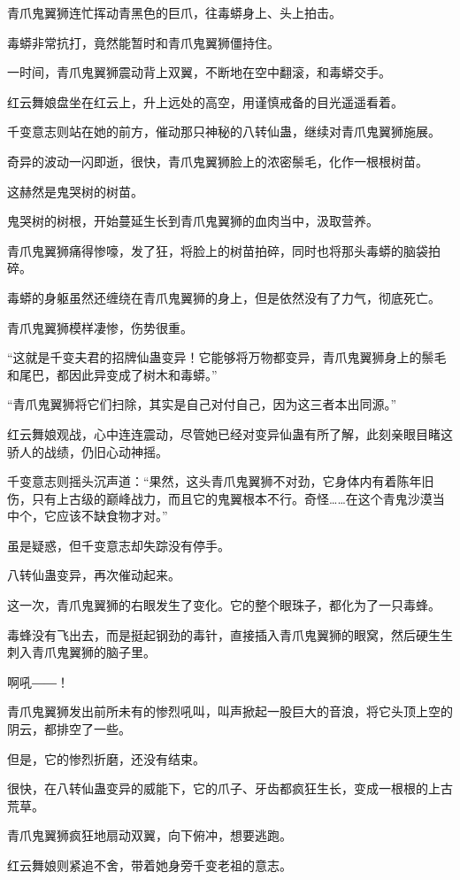 \begin{this_body}
青爪鬼翼狮连忙挥动青黑色的巨爪，往毒蟒身上、头上拍击。

毒蟒非常抗打，竟然能暂时和青爪鬼翼狮僵持住。

一时间，青爪鬼翼狮震动背上双翼，不断地在空中翻滚，和毒蟒交手。

红云舞娘盘坐在红云上，升上远处的高空，用谨慎戒备的目光遥遥看着。

千变意志则站在她的前方，催动那只神秘的八转仙蛊，继续对青爪鬼翼狮施展。

奇异的波动一闪即逝，很快，青爪鬼翼狮脸上的浓密鬃毛，化作一根根树苗。

这赫然是鬼哭树的树苗。

鬼哭树的树根，开始蔓延生长到青爪鬼翼狮的血肉当中，汲取营养。

青爪鬼翼狮痛得惨嚎，发了狂，将脸上的树苗拍碎，同时也将那头毒蟒的脑袋拍碎。

毒蟒的身躯虽然还缠绕在青爪鬼翼狮的身上，但是依然没有了力气，彻底死亡。

青爪鬼翼狮模样凄惨，伤势很重。

“这就是千变夫君的招牌仙蛊变异！它能够将万物都变异，青爪鬼翼狮身上的鬃毛和尾巴，都因此异变成了树木和毒蟒。”

“青爪鬼翼狮将它们扫除，其实是自己对付自己，因为这三者本出同源。”

红云舞娘观战，心中连连震动，尽管她已经对变异仙蛊有所了解，此刻亲眼目睹这骄人的战绩，仍旧心动神摇。

千变意志则摇头沉声道：“果然，这头青爪鬼翼狮不对劲，它身体内有着陈年旧伤，只有上古级的巅峰战力，而且它的鬼翼根本不行。奇怪……在这个青鬼沙漠当中个，它应该不缺食物才对。”

虽是疑惑，但千变意志却失踪没有停手。

八转仙蛊变异，再次催动起来。

这一次，青爪鬼翼狮的右眼发生了变化。它的整个眼珠子，都化为了一只毒蜂。

毒蜂没有飞出去，而是挺起钢劲的毒针，直接插入青爪鬼翼狮的眼窝，然后硬生生刺入青爪鬼翼狮的脑子里。

啊吼――！

青爪鬼翼狮发出前所未有的惨烈吼叫，叫声掀起一股巨大的音浪，将它头顶上空的阴云，都排空了一些。

但是，它的惨烈折磨，还没有结束。

很快，在八转仙蛊变异的威能下，它的爪子、牙齿都疯狂生长，变成一根根的上古荒草。

青爪鬼翼狮疯狂地扇动双翼，向下俯冲，想要逃跑。

红云舞娘则紧追不舍，带着她身旁千变老祖的意志。


\end{this_body}
